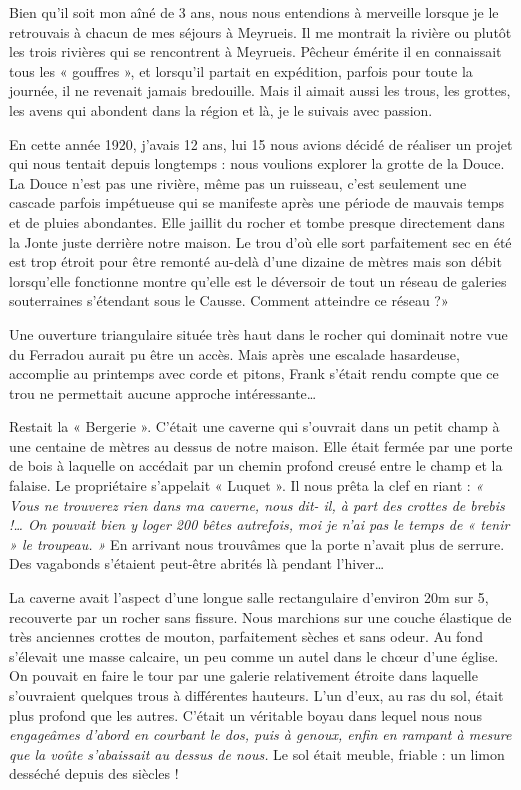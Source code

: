 Bien qu’il soit mon aîné de 3 ans, nous nous entendions à merveille lorsque je le retrouvais à
chacun de mes séjours à Meyrueis. Il me montrait la rivière ou plutôt les trois rivières qui se
rencontrent à Meyrueis.
Pêcheur émérite il en connaissait tous les « gouffres », et lorsqu’il partait en expédition,
parfois pour toute la journée, il ne revenait jamais bredouille. Mais il aimait aussi les trous, les
grottes, les avens qui abondent dans la région et là, je le suivais avec passion.

En cette année 1920, j’avais 12 ans, lui 15 nous avions décidé de réaliser un projet qui nous
tentait depuis longtemps : nous voulions explorer la grotte de la Douce. La Douce n’est pas
une rivière, même pas un ruisseau, c’est seulement une cascade parfois impétueuse qui se
manifeste après une période de mauvais temps et de pluies abondantes. Elle jaillit du rocher et
tombe presque directement dans la Jonte juste derrière notre maison. Le trou d’où elle sort
parfaitement sec en été est trop étroit pour être remonté au-delà d’une dizaine de mètres mais
son débit lorsqu’elle fonctionne montre qu’elle est le déversoir de tout un réseau de galeries
souterraines s’étendant sous le Causse. Comment atteindre ce réseau ?»

Une ouverture triangulaire située très haut dans le rocher qui dominait notre vue du Ferradou
aurait pu être un accès. Mais après une escalade hasardeuse, accomplie au printemps avec
corde et pitons, Frank s’était rendu compte que ce trou ne permettait aucune approche
intéressante…

Restait la « Bergerie ». C’était une caverne qui s’ouvrait dans un petit champ à une centaine
de mètres au dessus de notre maison. Elle était fermée par une porte de bois à laquelle on
accédait par un chemin profond creusé entre le champ et la falaise. Le propriétaire s’appelait
« Luquet ». Il nous prêta la clef en riant : \textit{« Vous ne trouverez rien dans ma caverne, nous dit-
il, à part des crottes de brebis !… On pouvait bien y loger 200 bêtes autrefois, moi je n’ai pas
le temps de « tenir » le troupeau. »} En arrivant nous trouvâmes que la porte n’avait plus de
serrure. Des vagabonds s’étaient peut-être abrités là pendant l’hiver…

La caverne avait l’aspect d’une longue salle rectangulaire d’environ 20m sur 5, recouverte par
un rocher sans fissure. Nous marchions sur une couche élastique de très anciennes crottes de
mouton, parfaitement sèches et sans odeur. Au fond s’élevait une masse calcaire, un peu
comme un autel dans le chœur d’une église.
On pouvait en faire le tour par une galerie relativement étroite dans laquelle s’ouvraient
quelques trous à différentes hauteurs. L’un d’eux, au ras du sol, était plus profond que les
autres. C’était un véritable boyau dans lequel nous nous \textit{engageâmes d’abord en courbant le dos,
puis à genoux, enfin en rampant à mesure que la voûte s’abaissait au dessus de nous.} Le sol
était meuble, friable : un limon desséché depuis des siècles !

